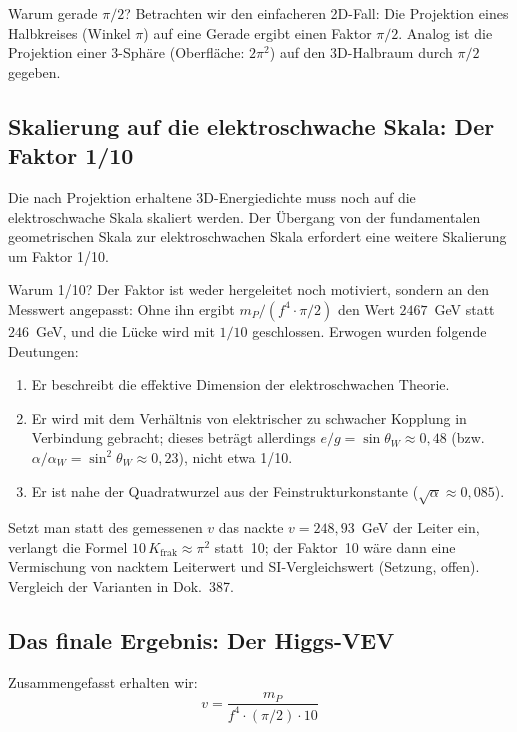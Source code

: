 	Warum gerade \(\pi/2\)? Betrachten wir den einfacheren 2D-Fall: Die Projektion eines Halbkreises (Winkel \(\pi\)) auf eine Gerade ergibt einen Faktor \(\pi/2\). Analog ist die Projektion einer 3-Sphäre (Oberfläche: \(2\pi^2\)) auf den 3D-Halbraum durch \(\pi/2\) gegeben.
	
	\subsection{Skalierung auf die elektroschwache Skala: Der Faktor 1/10}
	
	Die nach Projektion erhaltene 3D-Energiedichte muss noch auf die elektroschwache Skala skaliert werden. Der Übergang von der fundamentalen geometrischen Skala zur elektroschwachen Skala erfordert eine weitere Skalierung um Faktor 1/10.
	
	Warum 1/10? Der Faktor ist weder hergeleitet noch motiviert, sondern an den Messwert angepasst: Ohne ihn ergibt $m_P/(f^4\cdot\pi/2)$ den Wert $2467$~GeV statt $246$~GeV, und die Lücke wird mit $1/10$ geschlossen. Erwogen wurden folgende Deutungen:
	\begin{enumerate}
		\item Er beschreibt die effektive Dimension der elektroschwachen Theorie.
		\item Er wird mit dem Verhältnis von elektrischer zu schwacher Kopplung in Verbindung gebracht; dieses beträgt allerdings $e/g = \sin\theta_W \approx 0{,}48$ (bzw. $\alpha/\alpha_W = \sin^2\theta_W \approx 0{,}23$), nicht etwa 1/10.
		\item Er ist nahe der Quadratwurzel aus der Feinstrukturkonstante (\(\sqrt{\alpha} \approx 0{,}085\)).
	\end{enumerate}

	Setzt man statt des gemessenen $v$ das nackte $v=248{,}93$~GeV der Leiter ein, verlangt die Formel $10\,K_{\text{frak}}\approx\pi^2$ statt~10; der Faktor~10 wäre dann eine Vermischung von nacktem Leiterwert und SI-Vergleichswert (Setzung, offen). Vergleich der Varianten in Dok.~387.
	
	\subsection{Das finale Ergebnis: Der Higgs-VEV}
	
	Zusammengefasst erhalten wir:
	\begin{equation}
		\boxed{v = \frac{m_P}{f^4 \cdot (\pi/2) \cdot 10}}
	\end{equation}
	
